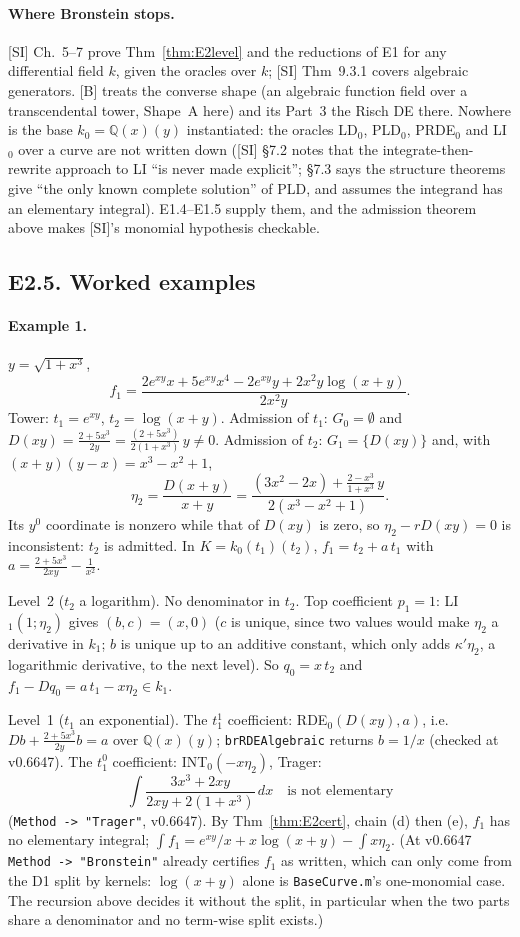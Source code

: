 \documentclass[11pt]{article}
\theoremstyle{definition}
\theoremstyle{remark}
\newcommand{\Q}{\mathbb{Q}}
\newcommand{\code}[1]{\texttt{#1}}
\begin{document}
\paragraph{Where Bronstein stops.} [SI] Ch.~5--7 prove Thm~\ref{thm:E2level} and the
reductions of E1 for any differential field $k$, given the oracles over $k$; [SI] Thm~9.3.1
covers algebraic generators. [B] treats the converse shape (an algebraic function field over
a transcendental tower, Shape~A here) and its Part~3 the Risch DE there. Nowhere is the
base $k_0=\Q(x)(y)$ instantiated: the oracles LD$_0$, PLD$_0$, PRDE$_0$ and LI$_0$ over a
curve are not written down ([SI] \S7.2 notes that the integrate-then-rewrite approach to
LI ``is never made explicit''; \S7.3 says the structure theorems give ``the only known
complete solution'' of PLD, and assumes the integrand has an elementary integral). E1.4--E1.5
supply them, and the admission theorem above makes [SI]'s monomial hypothesis checkable.

\subsection*{E2.5. Worked examples}

\paragraph{Example 1.} $y=\sqrt{1+x^3}$,
\[ f_1=\frac{2e^{xy}x+5e^{xy}x^4-2e^{xy}y+2x^2y\log(x+y)}{2x^2y}. \]
Tower: $t_1=e^{xy}$, $t_2=\log(x+y)$. Admission of $t_1$: $G_0=\emptyset$ and
$D(xy)=\frac{2+5x^3}{2y}=\frac{(2+5x^3)}{2(1+x^3)}\,y\ne0$. Admission of $t_2$:
$G_1=\{D(xy)\}$ and, with $(x+y)(y-x)=x^3-x^2+1$,
\[ \eta_2=\frac{D(x+y)}{x+y}=\frac{(3x^2-2x)+\frac{2-x^3}{1+x^3}\,y}{2(x^3-x^2+1)} .\]
Its $y^0$ coordinate is nonzero while that of $D(xy)$ is zero, so
$\eta_2-rD(xy)=0$ is inconsistent: $t_2$ is admitted. In $K=k_0(t_1)(t_2)$,
$f_1=t_2+a\,t_1$ with $a=\frac{2+5x^3}{2xy}-\frac1{x^2}$.

Level~2 ($t_2$ a logarithm). No denominator in $t_2$. Top coefficient $p_1=1$: LI$_1(1;\eta_2)$
gives $(b,c)=(x,0)$ ($c$ is unique, since two values would make $\eta_2$ a derivative in
$k_1$; $b$ is unique up to an additive constant, which only adds $\kappa'\eta_2$, a
logarithmic derivative, to the next level).
So $q_0=x\,t_2$ and $f_1-Dq_0=a\,t_1-x\eta_2\in k_1$.

Level~1 ($t_1$ an exponential). The $t_1^1$ coefficient: RDE$_0(D(xy),a)$, i.e.
$Db+\frac{2+5x^3}{2y}b=a$ over $\Q(x)(y)$; \code{brRDEAlgebraic} returns $b=1/x$
(checked at v0.6647). The $t_1^0$ coefficient: INT$_0(-x\eta_2)$, Trager:
\[ \int\frac{3x^3+2xy}{2xy+2(1+x^3)}\,dx \quad\text{is not elementary} \]
(\code{Method -> "Trager"}, v0.6647). By Thm~\ref{thm:E2cert}, chain (d) then (e), $f_1$ has
no elementary integral; $\int f_1=e^{xy}/x+x\log(x+y)-\int x\eta_2$. (At v0.6647
\code{Method -> "Bronstein"} already certifies $f_1$ as written, which can only come from the
D1 split by kernels: $\log(x+y)$ alone is \code{BaseCurve.m}'s one-monomial case. The
recursion above decides it without the split, in particular when the two parts share a
denominator and no term-wise split exists.)
\end{document}
